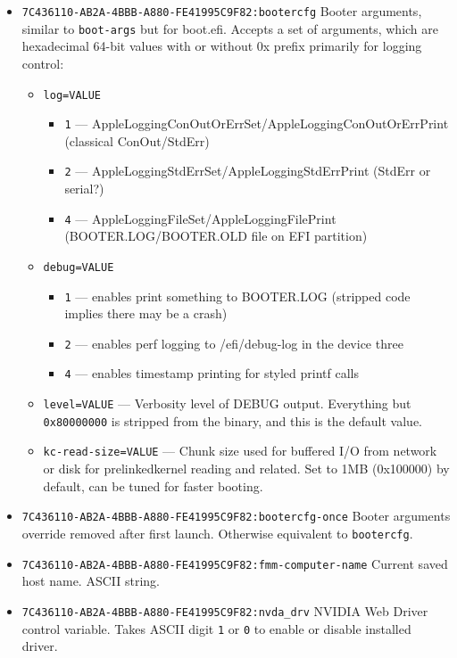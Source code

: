 \documentclass[]{article}
\begin{document}
\begin{itemize}
\item
  \texttt{7C436110-AB2A-4BBB-A880-FE41995C9F82:bootercfg}
  \break
  Booter arguments, similar to \texttt{boot-args} but for boot.efi. Accepts a set of
  arguments, which are hexadecimal 64-bit values with or without 0x prefix primarily
  for logging control:
  \begin{itemize}
  \item \texttt{log=VALUE}
    \begin{itemize}
    \item \texttt{1} --- AppleLoggingConOutOrErrSet/AppleLoggingConOutOrErrPrint
    (classical ConOut/StdErr)
    \item \texttt{2} --- AppleLoggingStdErrSet/AppleLoggingStdErrPrint (StdErr or serial?)
    \item \texttt{4} --- AppleLoggingFileSet/AppleLoggingFilePrint (BOOTER.LOG/BOOTER.OLD
    file on EFI partition)
    \end{itemize}
  \item \texttt{debug=VALUE}
  \begin{itemize}
  \item \texttt{1} --- enables print something to BOOTER.LOG (stripped code implies there
  may be a crash)
  \item \texttt{2} --- enables perf logging to /efi/debug-log in the device three
  \item \texttt{4} --- enables timestamp printing for styled printf calls
  \end{itemize}
  \item \texttt{level=VALUE} --- Verbosity level of DEBUG output. Everything but
  \texttt{0x80000000} is stripped from the binary, and this is the default value.
  \item \texttt{kc-read-size=VALUE} --- Chunk size used for buffered I/O from network or
  disk for prelinkedkernel reading and related. Set to 1MB (0x100000) by default, can be
  tuned for faster booting.
\end{itemize}
\item \texttt{7C436110-AB2A-4BBB-A880-FE41995C9F82:bootercfg-once}
  \break
  Booter arguments override removed after first launch. Otherwise equivalent to \texttt{bootercfg}.
\item
  \texttt{7C436110-AB2A-4BBB-A880-FE41995C9F82:fmm-computer-name}
  \break
  Current saved host name. ASCII string.
\item
  \texttt{7C436110-AB2A-4BBB-A880-FE41995C9F82:nvda\_drv}
  \break
  NVIDIA Web Driver control variable. Takes ASCII digit \texttt{1} or \texttt{0}
  to enable or disable installed driver.
\end{itemize}
\end{document}
